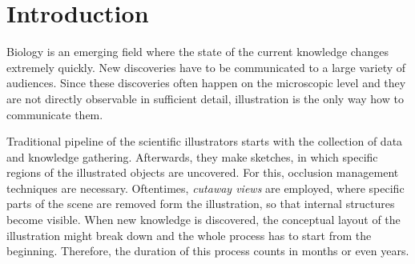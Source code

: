 \begin{abstract}

\begin{classification} %
\end{classification}

\end{abstract}




\section{Introduction}

Biology is an emerging field where the state of the current knowledge changes extremely quickly.
New discoveries have to be communicated to a large variety of audiences.
Since these discoveries often happen on the microscopic level and they are not directly observable in sufficient detail, illustration is the only way how to communicate them.

Traditional pipeline of the scientific illustrators starts with the collection of data and knowledge gathering.
Afterwards, they make sketches, in which specific regions of the illustrated objects are uncovered.
For this, occlusion management techniques are necessary.
Oftentimes, \emph{cutaway views} are employed, where specific parts of the scene are removed form the illustration, so that internal structures become visible.
When new knowledge is discovered, the conceptual layout of the illustration might break down and the whole process has to start from the beginning.
Therefore, the duration of this process counts in months or even years.

